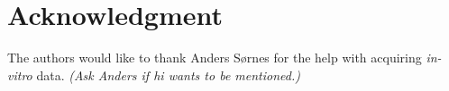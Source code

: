 \documentclass[journal]{IEEEtran}
\newcommand\comment[1]{\textit{{\color{red}(#1)}}}
\begin{document}






%





\section*{Acknowledgment}


The authors would like to thank Anders S\o{}rnes for the help with acquiring \textit{in-vitro} data. \comment{Ask Anders if hi wants to be mentioned.}
\end{document}
